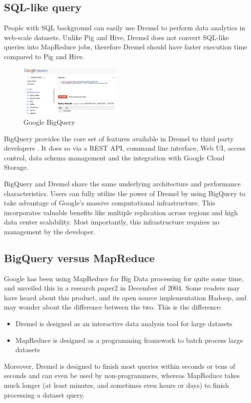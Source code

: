 \documentclass[twocolumn]{article}
\newcommand{\bi}{\begin{itemize}}
\newcommand{\ei}{\end{itemize}}
\newcommand{\ii}{\item}
\begin{document}
\subsection{SQL-like query}
People with SQL background can easily use Dremel to perform data analytics in web-scale datasets. Unlike Pig and Hive, Dremel does not convert SQL-like queries into MapReduce jobs, therefore Dremel should have faster execution time compared to Pig and Hive.

\begin{figure}[htb]
        \centering
        \includegraphics[width=0.45\textwidth]{google-bigquery.png}
        \caption{Google BigQuery}
        \label{fig:bigquery}
\end{figure}

BigQuery provides the core set of features available in Dremel to third party developers \cite{Sato:2012}. It does so via a REST API, command line interface, Web UI, access control, data schema management and the integration with Google Cloud Storage.

BigQuery and Dremel share the same underlying architecture and performance characteristics. Users can fully utilize the power of Dremel by using BigQuery
to take advantage of Google’s massive computational infrastructure. This incorporates valuable benefits like multiple replication across regions and
high data center scalability. Most importantly, this infrastructure requires no management by the developer.


\subsection{BigQuery versus MapReduce}
Google has been using MapReduce for Big Data processing for quite some time, and unveiled this in a research paper2 in December of 2004. Some readers may have heard about this product, and its open source implementation Hadoop, and may wonder about the difference between the two. This is the difference:
\bi
\ii Dremel is designed as an interactive data analysis tool for large datasets 
\ii MapReduce is designed as a programming framework to batch process large datasets
\ei
Moreover, Dremel is designed to finish most queries within seconds or tens of seconds and can even be used by non-programmers, whereas MapReduce takes much longer (at least minutes, and sometimes even hours or days) to finish processing a dataset query.
\end{document}
